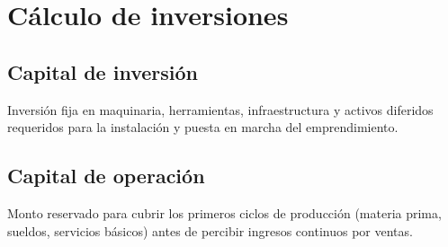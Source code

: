 \section{Cálculo de inversiones}
\label{sec:calculo_inversiones}

\subsection{Capital de inversión}
Inversión fija en maquinaria, herramientas, infraestructura y activos diferidos requeridos para la instalación y puesta en marcha del emprendimiento.

\subsection{Capital de operación}
Monto reservado para cubrir los primeros ciclos de producción (materia prima, sueldos, servicios básicos) antes de percibir ingresos continuos por ventas.


